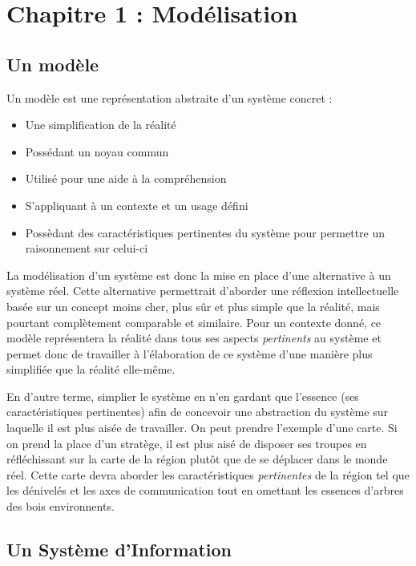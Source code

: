 \documentclass[../Syllabus.tex]{subfiles}
\begin{document}
\section{Chapitre 1 : Modélisation}

\subsection{Un modèle}

Un modèle est une représentation abstraite d'un système concret :

\begin{itemize}
  \item Une simplification de la réalité
  \item Possédant un noyau commun
  \item Utilisé pour une aide à la compréhension
  \item S'appliquant à un contexte et un usage défini
  \item Possèdant des caractéristiques pertinentes du système pour permettre un raisonnement sur celui-ci
\end{itemize}

La modélisation d'un système est donc la mise en place d'une alternative à un système réel. Cette alternative permettrait d'aborder une réflexion intellectuelle basée sur un concept moins cher, plus sûr et plus simple que la réalité, mais pourtant complètement comparable et similaire. Pour un contexte donné, ce modèle représentera la réalité dans tous ses aspects \textit{pertinents} au système et permet donc de travailler à l'élaboration de ce système d'une manière plus simplifiée que la réalité elle-même.

En d'autre terme, simplier le système en n'en gardant que l'essence (ses caractéristiques pertinentes) afin de concevoir une abstraction du système sur laquelle il est plus aisée de travailler. On peut prendre l'exemple d'une carte. Si on prend la place d'un stratège, il est plus aisé de disposer ses troupes en réfléchissant sur la carte de la région plutôt que de se déplacer dans le monde réel. Cette carte devra aborder les caractéristiques \textit{pertinentes} de la région tel que les dénivelés et les axes de communication tout en omettant les essences d'arbres des bois environnents.

\subsection{Un Système d'Information}
\end{document}
